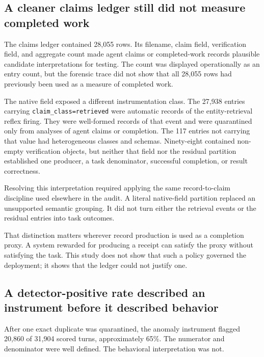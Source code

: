 \documentclass[12pt]{article}
\begin{document}
\subsection{A cleaner claims ledger still did not measure completed work}\label{a-cleaner-claims-ledger-still-did-not-measure-completed-work}

The claims ledger contained 28,055 rows. Its filename, claim field, verification field, and aggregate count made agent claims or completed-work records plausible candidate interpretations for testing. The count was displayed operationally as an entry count, but the forensic trace did not show that all 28,055 rows had previously been used as a measure of completed work.

The native field exposed a different instrumentation class. The 27,938 entries carrying \texttt{claim\_\allowbreak class=\allowbreak retrieved} were automatic records of the entity-retrieval reflex firing. They were well-formed records of that event and were quarantined only from analyses of agent claims or completion. The 117 entries not carrying that value had heterogeneous classes and schemas. Ninety-eight contained non-empty verification objects, but neither that field nor the residual partition established one producer, a task denominator, successful completion, or result correctness.

Resolving this interpretation required applying the same record-to-claim discipline used elsewhere in the audit. A literal native-field partition replaced an unsupported semantic grouping. It did not turn either the retrieval events or the residual entries into task outcomes.

That distinction matters wherever record production is used as a completion proxy. A system rewarded for producing a receipt can satisfy the proxy without satisfying the task. This study does not show that such a policy governed the deployment; it shows that the ledger could not justify one.

\subsection{A detector-positive rate described an instrument before it described behavior}\label{a-detector-positive-rate-described-an-instrument-before-it-described-behavior}

After one exact duplicate was quarantined, the anomaly instrument flagged 20,860 of 31,904 scored turns, approximately 65\%. The numerator and denominator were well defined. The behavioral interpretation was not.
\end{document}
